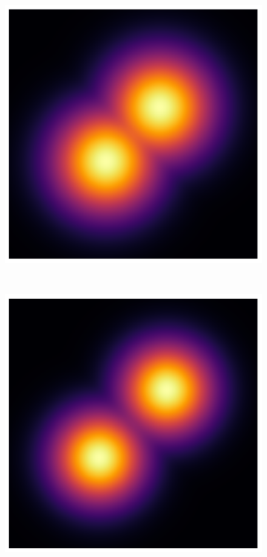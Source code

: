 \begin{figure}[t]
\begin{minipage}{0.333\linewidth}
    \end{minipage}%
    \begin{minipage}{0.333\linewidth}
      \centering
      \includegraphics[width=\linewidth]{../img/heatmap_path_3.pdf}
    \end{minipage}\\
    \begin{minipage}{0.333\linewidth}
      \centering
      \includegraphics[width=\linewidth]{../img/heatmap_path_4.pdf}

\end{minipage}
\end{figure}
